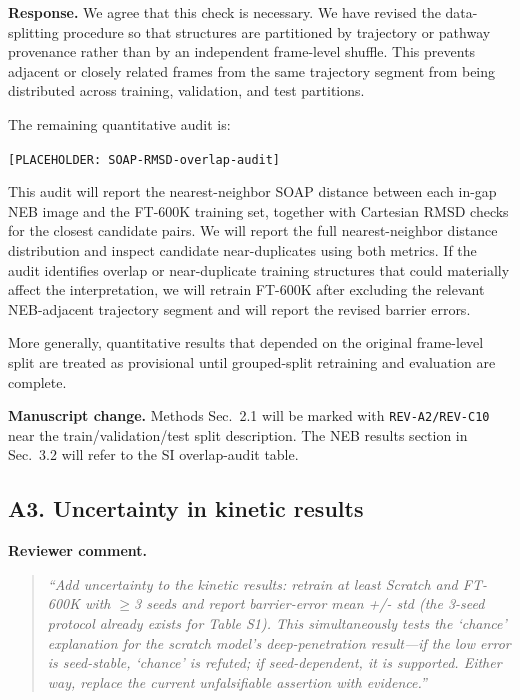 \documentclass[11pt,a4paper]{article}
\begin{document}
\noindent\textbf{Response.}
We agree that this check is necessary. We have revised the data-splitting procedure so that structures are partitioned by trajectory or pathway provenance rather than by an independent frame-level shuffle. This prevents adjacent or closely related frames from the same trajectory segment from being distributed across training, validation, and test partitions.

The remaining quantitative audit is:

\begin{center}
\texttt{[PLACEHOLDER: SOAP-RMSD-overlap-audit]}
\end{center}

This audit will report the nearest-neighbor SOAP distance between each in-gap NEB image and the FT-600K training set, together with Cartesian RMSD checks for the closest candidate pairs. We will report the full nearest-neighbor distance distribution and inspect candidate near-duplicates using both metrics. If the audit identifies overlap or near-duplicate training structures that could materially affect the interpretation, we will retrain FT-600K after excluding the relevant NEB-adjacent trajectory segment and will report the revised barrier errors.

More generally, quantitative results that depended on the original frame-level split are treated as provisional until grouped-split retraining and evaluation are complete.

\noindent\textbf{Manuscript change.}
Methods Sec.~2.1 will be marked with \texttt{REV-A2/REV-C10} near the train/validation/test split description. The NEB results section in Sec.~3.2 will refer to the SI overlap-audit table.

\subsection*{A3. Uncertainty in kinetic results}

\noindent\textbf{Reviewer comment.}
\begin{quote}
\itshape
``Add uncertainty to the kinetic results: retrain at least Scratch and FT-600K with $\geq$3 seeds and report barrier-error mean +/- std (the 3-seed protocol already exists for Table S1). This simultaneously tests the `chance' explanation for the scratch model's deep-penetration result---if the low error is seed-stable, `chance' is refuted; if seed-dependent, it is supported. Either way, replace the current unfalsifiable assertion with evidence.''
\end{quote}
\end{document}
